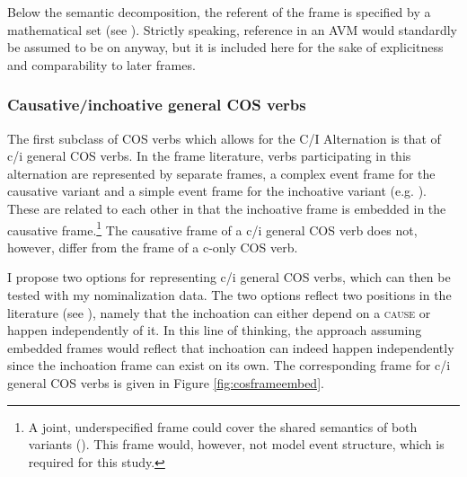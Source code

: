 Below the semantic decomposition, the referent of the frame is specified by a mathematical set (see ). Strictly speaking, reference in an AVM would standardly be assumed to be on  anyway, but it is included here for the sake of explicitness and comparability to later frames.

\subsubsection{Causative/inchoative general COS verbs}\label{sec:cos-input-frames-c/igeneral}\largerpage
The first subclass of COS verbs which allows for the C/I Alternation is that of c/i general COS verbs. 
In the frame literature, verbs participating in this alternation are represented by separate frames, a complex event frame for the causative variant and a simple event frame for the inchoative variant (e.g. \citealt{Osswald.2014,Seyffarth.2018}). These are related to each other in that the inchoative frame is embedded in the causative frame.\footnote{A joint, underspecified frame could cover the shared semantics of both variants (\citealt{Seyffarth.2018}). This frame would, however, not model event structure, which is required for this study.}
The causative frame of a c/i general COS verb does not, however, differ from the frame of a c-only COS verb. 

I propose two options for representing c/i general COS verbs, which can then be tested with my nominalization data. The two options reflect two positions in the literature (see ), namely that the inchoation can either depend on a \textsc{cause} or happen independently of it. In this line of thinking, the approach assuming embedded frames would reflect that inchoation can indeed happen independently since the inchoation frame can exist on its own. The corresponding frame for c/i general COS verbs is given in Figure \ref{fig:cosframeembed}. 

